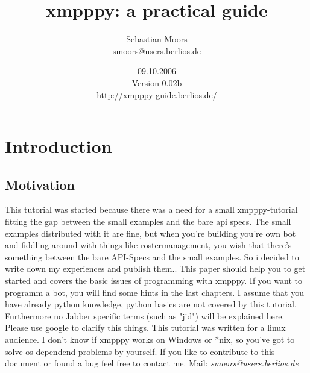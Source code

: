 \documentclass[a4paper,10pt]{report}
\title{xmpppy: a practical guide}
\author{Sebastian Moors \\[1cm] smoors@users.berlios.de}
\date{09.10.2006 \\[1cm] Version 0.02b \\[1cm] http://xmpppy-guide.berlios.de/}
\begin{document}
\begin{titlepage}
\maketitle


\end{titlepage}
\tableofcontents
\newpage




\chapter{Introduction}
\section{Motivation}
This tutorial was started because there was a need for a small xmpppy-tutorial fitting the gap between the small examples and the bare api specs. The small examples distributed with it are fine, but when you're building you're own bot and fiddling around with things like rostermanagement, you wish that there's something between the bare API-Specs and the small examples. So i decided to write down my experiences and publish them..
\newline
This paper should help you to get started and covers the basic issues of programming with xmpppy.
If you want to programm a bot, you will find some hints in the last chapters.
I assume that you have already python knowledge, python basics are not covered by this tutorial.
\newline
\newline
Furthermore no Jabber specific terms (such as "jid") will be explained here. Please use google to clarify this things.
\newline
\newline
This tutorial was written for a linux audience. I don't know if xmpppy works on Windows or *nix, so you've got to solve os-dependend problems by yourself.
\newline
\newline
If you like to contribute to this document or found a bug feel free to contact me.
\newline
\newline Mail: \textit{smoors@users.berlios.de}
\end{document}
